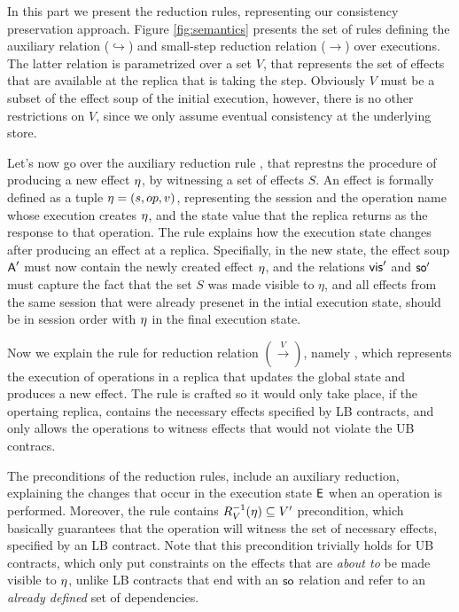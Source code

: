 In this part we present the reduction rules, representing our
consistency preservation approach.
Figure \ref{fig:semantics} presents the set of rules defining the
auxiliary relation ($\hookrightarrow$) and small-step reduction relation 
($\rightarrow$) over executions. The latter relation is parametrized
over a set $V$,
that represents the set of effects that are available at the replica
that is 
taking the step. Obviously $V$ must be a subset of the effect soup 
of the initial execution, however, there is no other restrictions on $V$,
since we only assume eventual consistency at the underlying store.

Let's now go over the auxiliary reduction rule
,
that represtns the procedure of producing a new effect $\eta$, by witnessing a set
of effects $S$. 
An effect is formally defined as a tuple $\eta=(s,op,v)$, representing the
session and the operation name 
whose execution creates $\eta$, and the state value
that the replica returns as the response to that operation.
The rule explains how the execution state changes after producing an
effect at a replica. Specifially, in the new state, the effect soup
${\normalfont \textsf{A}}'$ must
now contain the newly created effect $\eta$, and the relations ${\normalfont \textsf{vis}}'$
and ${\normalfont \textsf{so}}'$ must capture the fact that the set $S$ was made
visible to $\eta$, and all effects from the same session that were
already presenet in the intial execution state, should be in session
order with $\eta$ in the final execution state.


Now we explain the rule for reduction relation $(\xrightarrow{V})$,
namely , which represents the execution of operations
in a replica that updates the global state and produces a new
effect. The rule is crafted so it would only take place, if the
opertaing replica, contains the necessary effects specified by LB
contracts, and only allows the operations to witness effects that would
not violate the UB contracs.



The preconditions of the reduction rules, include an auxiliary
reduction, explaining the changes that occur in the execution state ${\normalfont \textsf{E}}$
when an operation is performed. 
Moreover, the rule contains
$R_V^{-1}(\eta)\subseteq V'$ precondition, which basically guarantees
that the operation will witness the set of necessary effects, specified
by an LB contract. Note that this precondition trivially holds for UB
contracts, which only put constraints on the effects that are
\emph{about to} be made
visible to $\eta$, unlike LB contracts that end with an ${\normalfont \textsf{so}}$ relation and
refer to an \emph{already defined} set of dependencies. 

